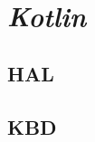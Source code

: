 \documentclass[10pt,a4paper,twocolumn]{article}
\begin{document}
\clearpage
\section{\textit{Kotlin}}
\subsection{HAL}



\subsection{KBD}

\end{document}

